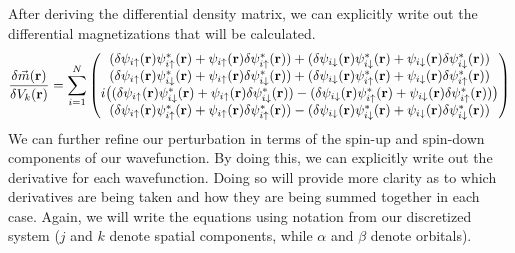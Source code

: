 \documentclass[10pt]{revtex4-1}
\newcommand{\bfr}{{\bf r}}
\newcommand{\ua}{\uparrow}
\newcommand{\da}{\downarrow}
\begin{document}
After deriving the differential density matrix, we can explicitly write out the differential magnetizations that will be calculated.
\begin{equation}
  \frac{\delta \vec{m}(\bfr)}{\delta V_k(\bfr)} = \sum_{i=1}^N
  \begin{pmatrix}
    (\delta \psi_{i \ua}(\bfr) \psi_{i \ua}^*(\bfr) + \psi_{i \ua}(\bfr) \delta \psi_{i \ua}^*(\bfr)) + (\delta \psi_{i \da}(\bfr) \psi_{i \da}^*(\bfr) + \psi_{i \da}(\bfr) \delta \psi_{i \da}^*(\bfr)) \\
    (\delta \psi_{i \ua}(\bfr) \psi_{i \da}^*(\bfr) + \psi_{i \ua}(\bfr) \delta \psi_{i \da}^*(\bfr)) + (\delta \psi_{i \da}(\bfr) \psi_{i \ua}^*(\bfr) + \psi_{i \da}(\bfr) \delta \psi_{i \ua}^*(\bfr)) \\
    i\big((\delta \psi_{i \ua}(\bfr) \psi_{i \da}^*(\bfr) + \psi_{i \ua}(\bfr) \delta \psi_{i \da}^*(\bfr)) - (\delta \psi_{i \da}(\bfr) \psi_{i \ua}^*(\bfr) + \psi_{i \da}(\bfr) \delta \psi_{i \ua}^*(\bfr))\big) \\
    (\delta \psi_{i \ua}(\bfr) \psi_{i \ua}^*(\bfr) + \psi_{i \ua}(\bfr) \delta \psi_{i \ua}^*(\bfr)) - (\delta \psi_{i \da}(\bfr) \psi_{i \da}^*(\bfr) + \psi_{i \da}(\bfr) \delta \psi_{i \da}^*(\bfr)) \\
  \end{pmatrix}
\end{equation}
We can further refine our perturbation in terms of the spin-up and spin-down components of our wavefunction.
By doing this, we can explicitly write out the derivative for each wavefunction.
Doing so will provide more clarity as to which derivatives are being taken and how they are being summed together in each case.
Again, we will write the equations using notation from our discretized system ($j$ and $k$ denote spatial components, while $\alpha$ and $\beta$ denote orbitals).
\end{document}
